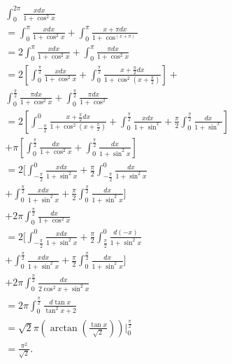   \begin{solution}
    \begin{align*}
    &\int_0^{2\pi }\frac{x dx}{1+\cos^2x}\\&=\int_0^{\pi}\frac{x dx}{1+\cos^2x}+\int_0^{\pi}\frac{x+\pi dx}{1+\cos^(x+\pi)}\\
    &=2\int_0^{\pi}\frac{xdx}{1+\cos^2x}+\int_0^{\pi}\frac{\pi dx}{1+\cos^2x}\\
    &=2[\int_0^{\frac{\pi}{2}}\frac{xdx}{1+\cos^2x}+\int_0^{\frac{\pi}{2}}\frac{x+\frac{\pi}{2}dx}{1+\cos^2(x+\frac{\pi}{2})}]+\\
    &\int_0^{\frac{\pi}{2}}\frac{\pi dx}{1+\cos^2x}+\int_0^{\frac{\pi}{2}}\frac{\pi dx}{1+\cos^2}\\
    &=2[\int_{-\frac{\pi}{2}}^0\frac{x+\frac{\pi}2dx}{1+\cos^2(x+\frac{\pi}{2})}+\int_0^{\frac{\pi}{2}}\frac{xdx}{1+\sin^x}+\frac{\pi}{2}\int_0^{\frac{\pi}{2}}\frac{dx}{1+\sin^x}]\\
    &+\pi[\int_0^{\frac{\pi}{2}}\frac{dx}{1+\cos^2x}+\int_0^{\frac{\pi}{2}}\frac{dx}{1+\sin^2x}]\\
    &=2[\int_{-\frac{\pi}{2}}^0\frac{xdx}{1+\sin^2x}+\frac{\pi}{2}\int_{-\frac{\pi}{2}}^0\frac{dx}{1+\sin^2x}\\
    &+\int_0^{\frac{\pi}{2}}\frac{xdx}{1+\sin^2x}+\frac{\pi}{2}\int_0^{\frac{\pi}{2}}\frac{dx}{1+\sin^2x}]\\
    &+2\pi\int_0^{\frac{\pi}{2}}\frac{dx}{1+\cos^2x}\\
    &=2[\int_{-\frac{\pi}{2}}^0\frac{xdx}{1+\sin^2x}+\frac{\pi}{2}\int_{\frac{\pi}{2}}^0\frac{d(-x)}{1+\sin^2x}\\
    &+\int_0^{\frac{\pi}{2}}\frac{xdx}{1+\sin^2x}+\frac{\pi}{2}\int_0^{\frac{\pi}{2}}\frac{dx}{1+\sin^2x}]\\
    &+2\pi\int_0^{\frac{\pi}{2}}\frac{dx}{2\cos^2x+\sin^2x}\\
    &=2\pi\int_0^{\frac{\pi}{2}}\frac{d\tan x}{\tan^2x+2}\\
    &=\sqrt{2}\pi(\arctan(\frac{\tan x}{\sqrt{2}}))|_0^{\frac{\pi}{2}}\\
    &=\frac{\pi^2}{\sqrt{2}}.\\
  \end{align*}
  \end{solution}
  

